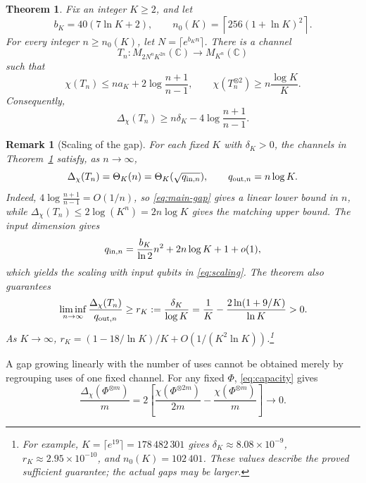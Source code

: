 \documentclass[11pt]{article}
\numberwithin{equation}{section}
\newtheorem{theorem}{Theorem}[section]
\theoremstyle{boldremark}\newtheorem{remark}[theorem]{Remark}
\newtheorem*{remark*}{Remark}
\newcommand{\C}{\mathbb C}
\newcommand{\M}{M}
\begin{document}
\begin{theorem}\label{thm:main}
Fix an integer $K\ge2$, and let
\begin{equation}
 b_K=40(7\ln K+2),\qquad
 n_0(K)=\left\lceil256(1+\ln K)^2\right\rceil.
 \label{eq:dimension-constant}
\end{equation}
For every integer $n\ge n_0(K)$, let $N=\lceil e^{b_Kn}\rceil$.
There is a channel
\[
 T_n:\M_{2N^nK^{2n}}(\C)\to\M_{K^n}(\C)
\]
such that
\begin{equation}
 \chi(T_n)\le na_K+2\log\frac{n+1}{n-1},
 \qquad \chi(T_n^{\otimes2})\ge n\frac{\log K}{K}.
 \label{eq:main-holevo}
\end{equation}
Consequently,
\begin{equation}
 \Delta_\chi(T_n)\ge n\delta_K-4\log\frac{n+1}{n-1}.
 \label{eq:main-gap}
\end{equation}
\end{theorem}

\begin{remark*}[Scaling of the gap]
For each fixed $K$ with $\delta_K>0$, the channels in
Theorem~\ref{thm:main} satisfy, as $n\to\infty$,
\begin{equation}
 \Delta_\chi(T_n)=\Theta_K(n)=\Theta_K(\sqrt{q_{{\rm in},n}}),
 \qquad q_{{\rm out},n}=n\log K.
 \label{eq:scaling}
\end{equation}
Indeed, $4\log\frac{n+1}{n-1}=O(1/n)$, so \eqref{eq:main-gap}
gives a linear lower bound in $n$, while
$\Delta_\chi(T_n)\le2\log(K^n)=2n\log K$ gives the matching upper
bound. The input dimension gives
\begin{equation}
 q_{{\rm in},n}
 =\frac{b_K}{\ln2}n^2+2n\log K+1+o(1),
 \label{eq:input-size}
\end{equation}
which yields the scaling with input qubits in \eqref{eq:scaling}.
The theorem also guarantees
\begin{equation}
 \liminf_{n\to\infty}\frac{\Delta_\chi(T_n)}{q_{{\rm out},n}}
 \ge r_K:=\frac{\delta_K}{\log K}
 =\frac1K-\frac{2\ln(1+9/K)}{\ln K}>0.
 \label{eq:guaranteed-fraction}
\end{equation}
As $K\to\infty$,
$r_K=(1-18/\ln K)/K+O(1/(K^2\ln K))$.\footnote{For example,
$K=\lceil e^{19}\rceil=178\,482\,301$ gives
$\delta_K\approx8.08\times10^{-9}$,
$r_K\approx2.95\times10^{-10}$, and
$n_0(K)=102\,401$.
These values describe the proved sufficient guarantee; the actual
gaps may be larger.}
\end{remark*}

A gap growing linearly with the number of uses cannot be obtained merely by
regrouping uses of one fixed channel. For any fixed $\Phi$, \eqref{eq:capacity}
gives
\[
 \frac{\Delta_\chi(\Phi^{\otimes m})}{m}
 =2\left[\frac{\chi(\Phi^{\otimes2m})}{2m}
         -\frac{\chi(\Phi^{\otimes m})}{m}\right]\longrightarrow0.
\]
\end{document}
